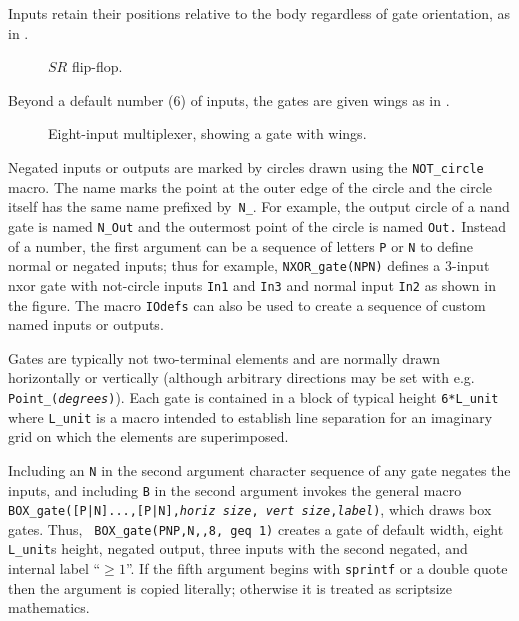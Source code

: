 Inputs retain their positions relative to the body
regardless of gate orientation, as in .
\begin{figure}[H]
   \vspace*{-\baselineskip}
   \parbox{4.75in}{\small }%
   
   \vspace*{-\baselineskip}
   \caption{$SR$ flip-flop.}
   \label{FF}
   \end{figure}

Beyond a default number (6) of inputs, the
gates are given wings as in .
\begin{figure}[H]
   
   \vspace*{-0.5\baselineskip}
   \caption{Eight-input multiplexer, showing a gate with wings.}
   \label{exVIII}
   \end{figure}

Negated inputs or outputs are marked by circles drawn using the
\verb|NOT_circle| macro.  The name marks the point at the outer edge of the
circle and the circle itself has the same name prefixed by~{\tt N\_}.
For example, the output circle of a nand gate is named
{\tt N\_Out} and the outermost point of the circle is named {\tt Out.}
Instead of a number, the first argument can be a sequence of letters {\tt P}
or {\tt N} to define normal or negated inputs; thus for example,
{\tt NXOR\_gate(NPN)} defines a 3-input nxor gate with not-circle
inputs {\tt In1} and {\tt In3} and normal input {\tt In2}
as shown in the figure.
The macro {\tt IOdefs} can also be used to create a sequence of custom
named inputs or outputs.

Gates are typically not two-terminal elements and are normally drawn
horizontally or vertically (although arbitrary directions may be set
with e.g. {\tt Point\_({\sl degrees})}).
Each gate is contained in a
block of typical height {\tt 6*L\_unit} where {\tt L\_unit} is a macro
intended to establish line separation for an imaginary grid on which
the elements are superimposed.

Including an \verb|N| in the second
argument character sequence of any gate negates the inputs, and including
\verb|B| in the second argument invokes the
general macro {\tt BOX\_gate([P|N]...,[P|N],{\sl horiz size},{\sl
vert size},{\sl label})}, which draws box gates.  Thus, {\tt
BOX\_gate(PNP,N,{},8, geq 1)} creates a gate of default width,
eight {\tt L\_unit}s height, negated output, three inputs with the
second negated, and internal label ``$\geq1$''.
If the fifth argument begins with {\tt sprintf} or a double quote then
the argument is copied literally; otherwise it is treated as scriptsize
mathematics.

